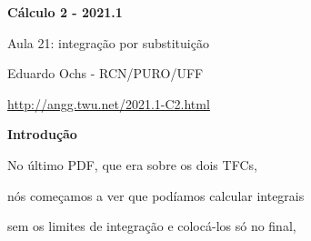 \documentclass[oneside,12pt]{article}
\begin{document}
\def\Sthree{
  \iequationbox {\Intx{a}{b}{f(g(x))g'(x)}}
                {\Intu{g(a)}{g(b)}{f(u)}}
}
\def\SthreeI{
  \iequationbox {\intx{f(g(x))g'(x)}}
                {\intu{f(u)}
                 \qquad [u=g(x)]
                }
}

\def\Sthree{
  \pmat{
    \D \Intx{a}{b}{f(g(x))g'(x)} \\
    \veq \\
    \D \Intu{g(a)}{g(b)}{f(u)}
  }}

\def\SthreeI{
  \pmat{
    \D \intx{f(g(x))g'(x)} \\
       \veq \\
    \D \intu{f(u)} \\
    \text{Obs: $u=g(x)$.} \\
  }}



\def\Subst#1{\bmat{#1}}



%

\thispagestyle{empty}

\begin{center}

\vspace*{1.2cm}

{\bf \Large Cálculo 2 - 2021.1}

\bsk

Aula 21: integração por substituição

\bsk

Eduardo Ochs - RCN/PURO/UFF

\url{http://angg.twu.net/2021.1-C2.html}

\end{center}

\newpage


{\bf Introdução}

\ssk

No último PDF, que era sobre os dois TFCs,

nós começamos a ver que podíamos calcular integrais

sem os limites de integração e colocá-los só no final,
\end{document}
